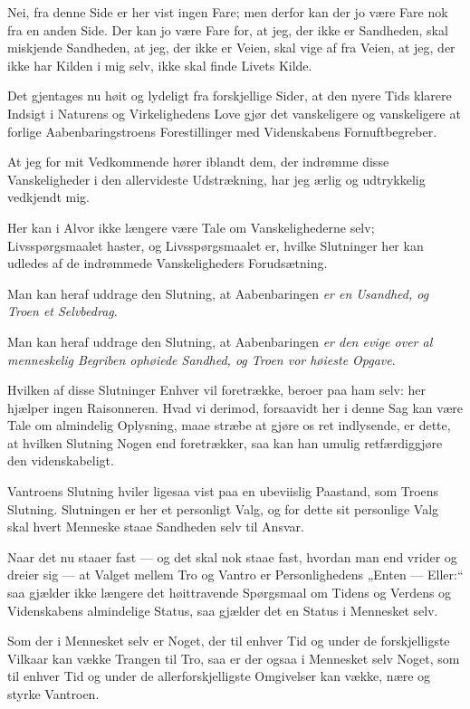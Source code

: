 \documentclass[12pt,a4paper]{book}
\newcommand{\apage}[1]{\marginnote{\footnotesize\textit{[#1]}}}
\begin{document}
Nei, fra denne Side er her vist ingen Fare; men derfor kan der jo
være Fare nok fra en anden Side. Der kan jo være Fare for, at jeg,
der ikke er Sandheden, skal miskjende Sandheden, at jeg, der ikke
er Veien, skal vige af fra Veien, at jeg, der ikke har Kilden i mig
selv, ikke skal finde Livets Kilde.

Det gjentages nu høit og lydeligt fra forskjellige Sider, at den
nyere Tids klarere Indsigt i Naturens og Virkelighedens Love gjør
det vanskeligere og vanskeligere at forlige Aabenbaringstroens
Forestillinger med Videnskabens Fornuftbegreber.

At jeg for mit Vedkommende hører iblandt dem, der indrømme disse
Vanskeligheder i den allervideste Udstrækning, har jeg ærlig og
udtrykkelig vedkjendt mig.

Her kan i Alvor ikke længere være Tale om Vanskelighederne selv;
Livsspørgsmaalet haster, og Livsspørgsmaalet er, hvilke Slutninger
her kan udledes af de indrømmede Vanskeligheders Forudsætning.

Man kan heraf uddrage den Slutning, at Aabenbaringen \apage{134} \emph{er en
Usandhed, og Troen et Selvbedrag}.

Man kan heraf uddrage den Slutning, at Aabenbaringen \emph{er den
evige over al menneskelig Begriben ophøiede Sandhed, og Troen vor
høieste Opgave}.

Hvilken af disse Slutninger Enhver vil foretrække, beroer paa ham
selv: her hjælper ingen Raisonneren. Hvad vi derimod, forsaavidt
her i denne Sag kan være Tale om almindelig Oplysning, maae
stræbe at gjøre os ret indlysende, er dette, at hvilken Slutning
Nogen end foretrækker, saa kan han umulig retfærdiggjøre den
videnskabeligt.

Vantroens Slutning hviler ligesaa vist paa en ubeviislig Paastand,
som Troens Slutning. Slutningen er her et personligt Valg, og for
dette sit personlige Valg skal hvert Menneske staae Sandheden selv
til Ansvar.

Naar det nu staaer fast --- og det skal nok staae fast, hvordan man
end vrider og dreier sig --- at Valget mellem Tro og Vantro er
Personlighedens „Enten --- Eller:“ saa gjælder ikke længere det
høittravende Spørgsmaal om Tidens og Verdens og Videnskabens
almindelige Status, saa gjælder det en Status i Mennesket selv.

Som der i Mennesket selv er Noget, der til enhver Tid og under de
forskjelligste Vilkaar kan vække Trangen til Tro, saa er der ogsaa i
Mennesket selv Noget, som til enhver Tid og under de
allerforskjelligste Omgivelser kan vække, nære og styrke Vantroen.
\end{document}
